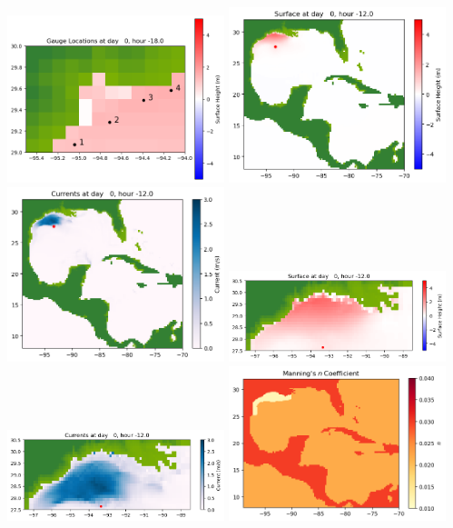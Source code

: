 \documentclass[11pt]{article}
\begin{document}
\includegraphics[width=0.475\textwidth]{frame0009fig1008.png}
\vskip 10pt 
\includegraphics[width=0.475\textwidth]{frame0010fig1001.png}
\includegraphics[width=0.475\textwidth]{frame0010fig1002.png}
\vskip 10pt 
\includegraphics[width=0.475\textwidth]{frame0010fig1003.png}
\includegraphics[width=0.475\textwidth]{frame0010fig1004.png}
\vskip 10pt 
\includegraphics[width=0.475\textwidth]{frame0010fig1005.png}
\end{document}
